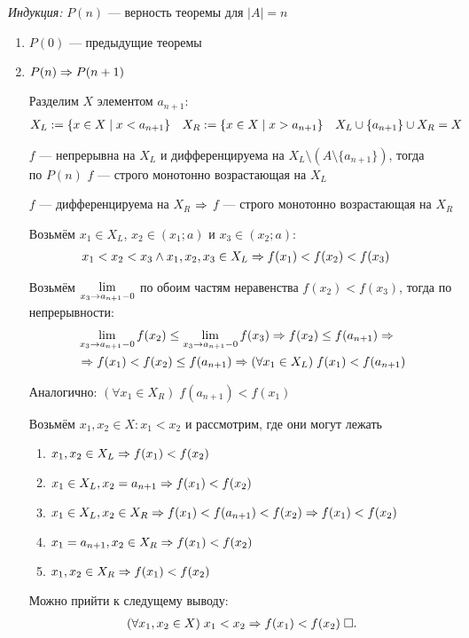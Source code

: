 \documentclass{article}
\begin{document}
{\it Индукция:} $P(n)$ --- верность теоремы для $|A|=n$
\begin{enumerate}
	\item{}$P(0)$ --- предыдущие теоремы
	\item{}$P(n)\Rightarrow P(n+1)$

	Разделим $X$ элементом $a_{n+1}$:
	\begin{align*}
		 & X_{L}:=\{x\in X\;|\;x<a_{n+1}\} &  & X_{R}:=\{x\in X\;|\;x> a_{n+1}\} &  & X_{L}\cup\{a_{n+1}\}\cup X_{R}=X
	\end{align*}

	\pagebreak

	$f$ --- непрерывна на $X_{L}$ и дифференцируема на $X_{L}\setminus (A\setminus \{a_{n+1}\})$, тогда\\
	по $P(n)$ $f$ --- строго монотонно возрастающая на $X_{L}$

	$f$ --- дифференцируема на $X_{R}$ $\Rightarrow$ $f$ --- строго монотонно возрастающая на $X_{R}$

	Возьмём $x_1\in X_{L}$, $x_2\in (x_1;a)$ и $x_3\in(x_2;a)$:
	\begin{align*}
		 & x_1<x_2<x_3\land x_1,x_2,x_3\in X_{L}\Rightarrow f(x_1)<f(x_2)<f(x_3)
	\end{align*}

	Возьмём $\lim\limits_{x_3\to a_{n+1}-0}$ по обоим частям неравенства $f(x_2)<f(x_3)$, тогда по непрерывности:
	\begin{align*}
		 & \lim\limits_{x_3\to a_{n+1}-0}f(x_2)\leq \lim\limits_{x_3\to a_{n+1}-0}f(x_{3})\Rightarrow f(x_2)\leq f(a_{n+1})\Rightarrow \\
		 & \Rightarrow f(x_1)<f(x_2)\leq f(a_{n+1})\Rightarrow (\forall x_1\in X_{L})\;f(x_1)<f(a_{n+1})
	\end{align*}

	Аналогично: $(\forall x_1\in X_{R})\;f(a_{n+1})<f(x_1)$

	Возьмём $x_1,x_2\in X:x_1<x_2$ и рассмотрим, где они могут лежать
	\begin{enumerate}
		\item{}$x_1,x_2\in X_{L}\Rightarrow f(x_1)<f(x_2)$
		\item{}$x_1\in X_{L},x_2=a_{n+1}\Rightarrow f(x_1)<f(x_2)$
		\item{}$x_1\in X_{L},x_2\in X_{R}\Rightarrow f(x_1)<f(a_{n+1})<f(x_2)\Rightarrow f(x_1)<f(x_2)$
		\item{}$x_1=a_{n+1},x_2\in X_{R}\Rightarrow f(x_1)<f(x_2)$
		\item{}$x_1,x_2\in X_{R}\Rightarrow f(x_1)<f(x_2)$
	\end{enumerate}

	Можно прийти к следущему выводу:
	\begin{align*}
		(\forall x_1,x_2\in X)\;x_1<x_2\Rightarrow f(x_1)<f(x_2)\;\square.
	\end{align*}

\end{enumerate}
\end{document}
